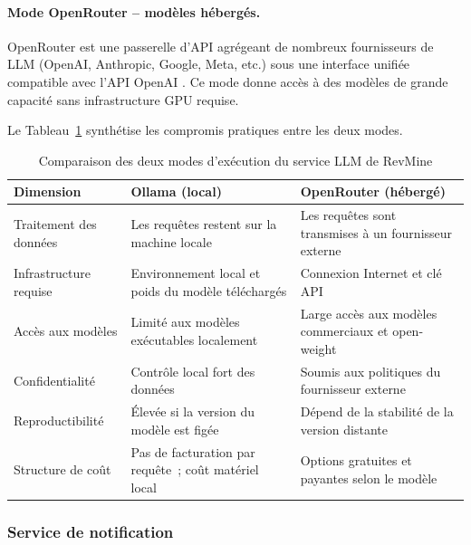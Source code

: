\paragraph{Mode OpenRouter -- modèles hébergés.} OpenRouter est une passerelle d'API agrégeant
de nombreux fournisseurs de LLM (OpenAI, Anthropic, Google, Meta, etc.) sous une interface
unifiée compatible avec l'API OpenAI \parencite{openrouter2023}. Ce mode donne accès à des
modèles de grande capacité sans infrastructure GPU requise.

Le Tableau~\ref{tab:backend_modes_fr} synthétise les compromis pratiques entre les deux modes.

\begin{table}[H]
\centering
\small
\caption{Comparaison des deux modes d'exécution du service LLM de RevMine}
\label{tab:backend_modes_fr}
\begin{tabular}{|>{\raggedright\arraybackslash}p{3.5cm}
                |>{\raggedright\arraybackslash}p{5.5cm}
                |>{\raggedright\arraybackslash}p{5.5cm}|}
\hline
\textbf{Dimension} & \textbf{Ollama (local)} & \textbf{OpenRouter (hébergé)} \\
\hline
Traitement des données & Les requêtes restent sur la machine locale & Les requêtes sont transmises à un fournisseur externe \\
\hline
Infrastructure requise & Environnement local et poids du modèle téléchargés & Connexion Internet et clé API \\
\hline
Accès aux modèles & Limité aux modèles exécutables localement & Large accès aux modèles commerciaux et open-weight \\
\hline
Confidentialité & Contrôle local fort des données & Soumis aux politiques du fournisseur externe \\
\hline
Reproductibilité & Élevée si la version du modèle est figée & Dépend de la stabilité de la version distante \\
\hline
Structure de coût & Pas de facturation par requête~; coût matériel local & Options gratuites et payantes selon le modèle \\
\hline
\end{tabular}
\end{table}

\subsubsection{Service de notification}


